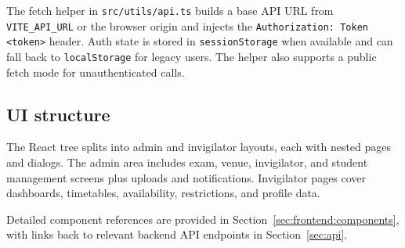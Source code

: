 The fetch helper in \texttt{src/utils/api.ts} builds a base API URL from \texttt{VITE\_API\_URL} or the browser origin and injects the \texttt{Authorization: Token <token>} header. Auth state is stored in \texttt{sessionStorage} when available and can fall back to \texttt{localStorage} for legacy users. The helper also supports a public fetch mode for unauthenticated calls.

\subsection{UI structure}
\label{subsec:frontend:ui}

The React tree splits into admin and invigilator layouts, each with nested pages and dialogs. The admin area includes exam, venue, invigilator, and student management screens plus uploads and notifications. Invigilator pages cover dashboards, timetables, availability, restrictions, and profile data.

Detailed component references are provided in Section~\ref{sec:frontend:components}, with links back to relevant backend API endpoints in Section~\ref{sec:api}.
